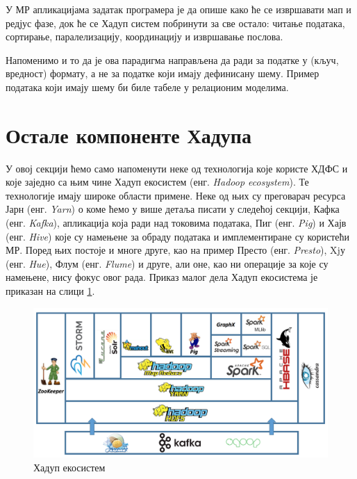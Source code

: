 \documentclass[12pt,oneside]{memoir}
\begin{document}
У МР апликацијама задатак програмера је да опише како ће се извршавати мап и редјус фазе, док ће се Хадуп систем побринути за све остало: читање података, сортирање, паралелизацију, координацију и извршавање послова. \cite{hadoop_beginner}

Напоменимо и то да је ова парадигма направљена да ради за податке у (кључ, вредност) формату, а не за податке који имају дефинисану шему. Пример података који имају шему би биле табеле у релационим моделима. \cite{hadoop_beginner}


\section{Остале компоненте Хадупа}
\label{sec:ostale_komp_hadupa}

У овој секцији ћемо само напоменути неке од технологија које користе ХДФС и које заједно са њим чине Хадуп екосистем (енг. \textit{Hadoop ecosystem}). Те технологије имају широке области примене. Неке од њих су преговарач ресурса Јарн (енг. \textit{Yarn}) о коме ћемо у више детаља писати у следећој секцији, Кафка (енг. \textit{Kafka}), апликација која ради над токовима података, Пиг (енг. \textit{Pig}) и Хајв (енг. \textit{Hive}) које су намењене за обраду података и имплементиране су користећи МР. Поред њих постоје и многе друге, као на пример Престо (енг. \textit{Presto}), Xjу (енг. \textit{Hue}), Флум (енг. \textit{Flume}) и друге, али оне, као ни операције за које су намењене, нису фокус овог рада. Приказ малог дела Хадуп екосистема је приказан на слици \ref{fig:hadoop_ecosystem}.


\begin{figure}[!ht]
  \centering
  \includegraphics[width=1\textwidth]{pictures/hadoop_ecosystem.png}
  \caption{Хадуп екосистем}
  \label{fig:hadoop_ecosystem}
\end{figure}
\end{document}

